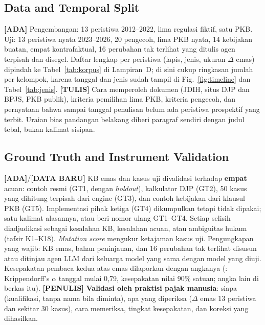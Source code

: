\documentclass{ieeeaccess}
\newcommand{\ADA}{\textcolor{stada}{\textbf{[ADA]}}}
\newcommand{\TULIS}{\textcolor{sttulis}{\textbf{[TULIS]}}}
\newcommand{\BARU}{\textcolor{stbaru}{\textbf{[DATA BARU]}}}
\newcommand{\PENULIS}{\textcolor{stpenulis}{\textbf{[PENULIS]}}}
\newenvironment{isi}{\par\smallskip\footnotesize\color{draftblue}\noindent}{\par\smallskip\normalsize\color{black}}
\begin{document}
\subsection{Data and Temporal Split}
\begin{isi}
\ADA{} Pengembangan: 13 peristiwa 2012--2022, lima regulasi fiktif, satu PKB. Uji: 13 peristiwa nyata 2023--2026, 20 pengecoh, lima PKB nyata, 14 kebijakan buatan, empat kontrafaktual, 16 perubahan tak terlihat yang ditulis agen terpisah dan disegel. Daftar lengkap per peristiwa (lapis, jenis, ukuran $\Delta$ emas) dipindah ke Tabel~\ref{tab:korpus} di Lampiran~D; di sini cukup ringkasan jumlah per kelompok, karena tanggal dan jenis sudah tampil di Fig.~\ref{fig:timeline} dan Tabel~\ref{tab:jenis}. \TULIS{} Cara memperoleh dokumen (JDIH, situs DJP dan BPJS, PKB publik), kriteria pemilihan lima PKB, kriteria pengecoh, dan pernyataan bahwa sampai tanggal penulisan belum ada peristiwa prospektif yang terbit. Uraian bias pandangan belakang diberi paragraf sendiri dengan judul tebal, bukan kalimat sisipan.
\end{isi}
\subsection{Ground Truth and Instrument Validation}
\begin{isi}
\ADA{}/\BARU{} KB emas dan kasus uji divalidasi terhadap \textbf{empat} acuan: contoh resmi (GT1, dengan \textit{holdout}), kalkulator DJP (GT2), 50 kasus yang dihitung terpisah dari engine (GT3), dan contoh kebijakan dari klausul PKB (GT5). Implementasi pihak ketiga (GT4) dikumpulkan tetapi tidak dipakai; satu kalimat alasannya, atau beri nomor ulang GT1--GT4. Setiap selisih diadjudikasi sebagai kesalahan KB, kesalahan acuan, atau ambiguitas hukum (tafsir K1--K18). \textit{Mutation score} mengukur ketajaman kasus uji. Pengungkapan yang wajib: KB emas, bahan peninjauan, dan 16 perubahan tak terlihat disusun atau ditinjau agen LLM dari keluarga model yang sama dengan model yang diuji. Kesepakatan pembaca kedua atas emas dilaporkan dengan angkanya (: Krippendorff's $\alpha$ tanggal mulai 0,79, kesepakatan nilai 90\% satuan; angka lain di berkas itu). \PENULIS{} \textbf{Validasi oleh praktisi pajak manusia}: siapa (kualifikasi, tanpa nama bila diminta), apa yang diperiksa ($\Delta$ emas 13 peristiwa dan sekitar 30 kasus), cara memeriksa, tingkat kesepakatan, dan koreksi yang dihasilkan.
\end{isi}
\end{document}
